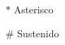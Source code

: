 \documentclass[12pt,openright,oneside,a4paper,brazil]{abntex2}
\begin{document}

\begin{simbolos}

\item[$ \ast $] Asterisco

\item[$ \# $] Sustenido

\end{simbolos}
\end{document}
